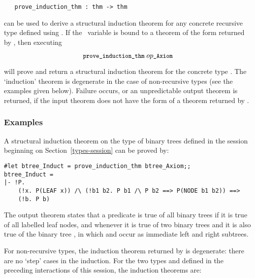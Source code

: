 {{\begin{boxed}
\begin{verbatim}
   prove_induction_thm : thm -> thm 
\end{verbatim}\end{boxed}


\noindent can be used to derive a structural induction
theorem for any concrete
recursive type defined using .  If the \ML\ 
variable  is bound to a theorem of the form
returned by \ml{define\_type}, 
then executing 

\[ \ml{prove\_induction\_thm}\;\ty{op}\ml{\_Axiom} \]

\noindent will prove  and  return a  structural induction  theorem for  
the concrete type
.  The `induction' theorem is degenerate in the case of non-recursive
types (see the examples given below). Failure occurs, or an unpredictable 
output theorem is returned, if the input theorem does not have the form
of a theorem  returned by \ml{define\_type}.

\subsubsection{Examples}

A structural induction theorem on the type of binary trees defined in the session
beginning on Section~\ref{types-session} can be proved by:

\begin{session}\begin{verbatim}
#let btree_Induct = prove_induction_thm btree_Axiom;;
btree_Induct =
|- !P.
    (!x. P(LEAF x)) /\ (!b1 b2. P b1 /\ P b2 ==> P(NODE b1 b2)) ==>
    (!b. P b)
\end{verbatim}\end{session}


\noindent The output theorem states that a predicate  is true of all
binary trees if it is true of all labelled leaf nodes, and whenever it is true
of two binary trees  and  it is also true of the binary tree
\ml{NODE b1 b2}, in which \ml{b1} and \ml{b2} occur as immediate left and right
subtrees.

For non-recursive types, the induction theorem returned by
 is degenerate: there are no `step' cases in the
induction.  For the two types \ml{three} and \ml{rec} defined in the preceding
interactions of this session, the induction theorems are:

}}
